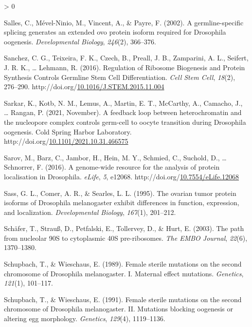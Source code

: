 \documentclass[12pt,oneside]{reedthesis}
\newlength{\cslhangindent}
\newenvironment{CSLReferences}[2] %
 {%
  \setlength{\parindent}{0pt}
  \ifodd #1 \everypar{\setlength{\hangindent}{\cslhangindent}}\ignorespaces\fi
  \ifnum #2 > 0
  \setlength{\parskip}{#2\baselineskip}
  \fi
 }%
 {}
\begin{document}
\begin{CSLReferences}{1}{0}
\leavevmode\hypertarget{ref-Salles2002}{}%
Salles, C., Mével-Ninio, M., Vincent, A., \& Payre, F. (2002). A germline-specific splicing generates an extended ovo protein isoform required for {Drosophila} oogenesis. \emph{Developmental Biology}, \emph{246}(2), 366--376.

\leavevmode\hypertarget{ref-Sanchez2016h}{}%
Sanchez, C. G., Teixeira, F. K., Czech, B., Preall, J. B., Zamparini, A. L., Seifert, J. R. K., \ldots{} Lehmann, R. (2016). Regulation of {Ribosome Biogenesis} and {Protein Synthesis Controls Germline Stem Cell Differentiation}. \emph{Cell Stem Cell}, \emph{18}(2), 276--290. http://doi.org/\href{https://doi.org/10.1016/J.STEM.2015.11.004}{10.1016/J.STEM.2015.11.004}

\leavevmode\hypertarget{ref-sarkarFeedbackLoopHeterochromatin2021}{}%
Sarkar, K., Kotb, N. M., Lemus, A., Martin, E. T., McCarthy, A., Camacho, J., \ldots{} Rangan, P. (2021, November). A feedback loop between heterochromatin and the nucleopore complex controls germ-cell to oocyte transition during {Drosophila} oogenesis. {Cold Spring Harbor Laboratory}. http://doi.org/\href{https://doi.org/10.1101/2021.10.31.466575}{10.1101/2021.10.31.466575}

\leavevmode\hypertarget{ref-sarovGenomewideResourceAnalysis2016}{}%
Sarov, M., Barz, C., Jambor, H., Hein, M. Y., Schmied, C., Suchold, D., \ldots{} Schnorrer, F. (2016). A genome-wide resource for the analysis of protein localisation in {Drosophila}. \emph{eLife}, \emph{5}, e12068. http://doi.org/\href{https://doi.org/10.7554/eLife.12068}{10.7554/eLife.12068}

\leavevmode\hypertarget{ref-Sass1995}{}%
Sass, G. L., Comer, A. R., \& Searles, L. L. (1995). The ovarian tumor protein isoforms of {Drosophila} melanogaster exhibit differences in function, expression, and localization. \emph{Developmental Biology}, \emph{167}(1), 201--212.

\leavevmode\hypertarget{ref-Schafer2003a}{}%
Schäfer, T., Strauß, D., Petfalski, E., Tollervey, D., \& Hurt, E. (2003). The path from nucleolar {90S} to cytoplasmic {40S} pre-ribosomes. \emph{The EMBO Journal}, \emph{22}(6), 1370--1380.

\leavevmode\hypertarget{ref-Schupbach1989c}{}%
Schupbach, T., \& Wieschaus, E. (1989). Female sterile mutations on the second chromosome of {Drosophila} melanogaster. {I}. {Maternal} effect mutations. \emph{Genetics}, \emph{121}(1), 101--117.

\leavevmode\hypertarget{ref-Schupbach1991f}{}%
Schupbach, T., \& Wieschaus, E. (1991). Female sterile mutations on the second chromosome of {Drosophila} melanogaster. {II}. {Mutations} blocking oogenesis or altering egg morphology. \emph{Genetics}, \emph{129}(4), 1119--1136.


\end{CSLReferences}
\end{document}
